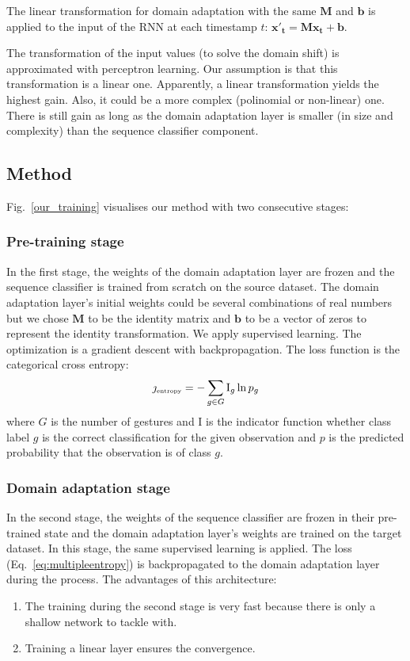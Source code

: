 \documentclass[conference]{IEEEtran}
\begin{document}
The linear transformation for domain adaptation with the same $\mathbf{M}$ and $\mathbf{b}$ is applied to the input of the RNN at each timestamp $t$: $\mathbf{x'_t}=\mathbf{M}\mathbf{x_t} + \mathbf{b}$.

The transformation of the input values (to solve the domain shift) is approximated with perceptron learning.
Our assumption is that this transformation is a linear one.
Apparently, a linear transformation yields the highest gain.
Also, it could be a more complex (polinomial or non-linear) one. There is still gain as long as the domain adaptation layer is smaller (in size and complexity) than the sequence classifier component.

\subsection{Method}

Fig.~\ref{our_training} visualises our method with two consecutive stages:

\subsubsection{Pre-training stage}
In the first stage, the weights of the domain adaptation layer are frozen and the sequence classifier is trained from scratch on the source dataset.
The domain adaptation layer's initial weights could be several combinations of real numbers but we chose $\mathbf{M}$ to be the identity matrix and $\mathbf{b}$ to be a vector of zeros to represent the identity transformation.
We apply supervised learning. The optimization is a gradient descent with backpropagation. The loss function is the categorical cross entropy:
\begin{equation}
  \label{eq:multipleentropy}
  \jmath_{\mbox{\tiny entropy}} = -\sum_{g \in G} {\textrm{I}_{g} \ln p_g}
\end{equation}
where $G$ is the number of gestures and I is the indicator function whether class label $g$ is the correct classification for the given observation and
$p$ is the predicted probability that the observation is of class $g$.

\subsubsection{Domain adaptation stage}
In the second stage, the weights of the sequence classifier are frozen in their pre-trained state and the domain adaptation layer's weights are trained on the target dataset.
In this stage, the same supervised learning is applied. The loss (Eq.~\eqref{eq:multipleentropy}) is backpropagated to the domain adaptation layer during the process.
The advantages of this architecture:
\begin{enumerate}
  \item The training during the second stage is very fast because there is only a shallow network to tackle with.
  \item Training a linear layer ensures the convergence.
\end{enumerate}
\end{document}

